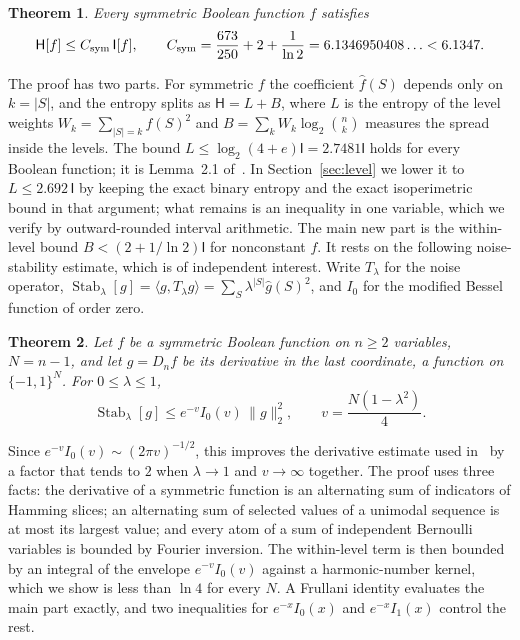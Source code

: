 \documentclass[11pt]{amsart}
\newtheorem{mainthm}{Theorem}
\theoremstyle{definition}
\theoremstyle{remark}
\newcommand{\bits}{\{-1,1\}}
\newcommand{\HH}{\mathsf H}
\newcommand{\I}{\mathsf I}
\newcommand{\wh}[1]{\widehat{#1}}
\DeclareMathOperator{\Stab}{Stab}
\begin{document}
\begin{mainthm}\label{thm:main}
Every symmetric Boolean function $f$ satisfies
\[
 \HH[f]\le C_{\rm sym}\,\I[f],\qquad
 C_{\rm sym}=\frac{673}{250}+2+\frac{1}{\ln2}=6.1346950408\ldots<6.1347.
\]
\end{mainthm}

The proof has two parts. For symmetric $f$ the coefficient $\wh f(S)$ depends only on $k=|S|$, and the entropy splits as $\HH=L+B$, where $L$ is the entropy of the level weights $W_k=\sum_{|S|=k}\wh f(S)^2$ and $B=\sum_kW_k\log_2\binom nk$ measures the spread inside the levels. The bound $L\le\log_2(4+e)\I=2.7481\I$ holds for every Boolean function; it is Lemma~2.1 of~\cite{Shm26}. In Section~\ref{sec:level} we lower it to $L\le2.692\,\I$ by keeping the exact binary entropy and the exact isoperimetric bound in that argument; what remains is an inequality in one variable, which we verify by outward-rounded interval arithmetic. The main new part is the within-level bound $B<(2+1/\ln2)\I$ for nonconstant $f$. It rests on the following noise-stability estimate, which is of independent interest. Write $T_\lambda$ for the noise operator, $\Stab_\lambda[g]=\langle g,T_\lambda g\rangle=\sum_S\lambda^{|S|}\wh g(S)^2$, and $I_0$ for the modified Bessel function of order zero.

\begin{mainthm}\label{thm:stab}
Let $f$ be a symmetric Boolean function on $n\ge2$ variables, $N=n-1$, and let $g=D_nf$ be its derivative in the last coordinate, a function on $\bits^N$. For $0\le\lambda\le1$,
\[
 \Stab_\lambda[g]\le e^{-v}I_0(v)\,\|g\|_2^2,\qquad v=\frac{N(1-\lambda^2)}{4}.
\]
\end{mainthm}

Since $e^{-v}I_0(v)\sim(2\pi v)^{-1/2}$, this improves the derivative estimate used in~\cite{OWZ11} by a factor that tends to $2$ when $\lambda\to1$ and $v\to\infty$ together. The proof uses three facts: the derivative of a symmetric function is an alternating sum of indicators of Hamming slices; an alternating sum of selected values of a unimodal sequence is at most its largest value; and every atom of a sum of independent Bernoulli variables is bounded by Fourier inversion. The within-level term is then bounded by an integral of the envelope $e^{-v}I_0(v)$ against a harmonic-number kernel, which we show is less than $\ln4$ for every $N$. A Frullani identity evaluates the main part exactly, and two inequalities for $e^{-x}I_0(x)$ and $e^{-x}I_1(x)$ control the rest.
\end{document}
